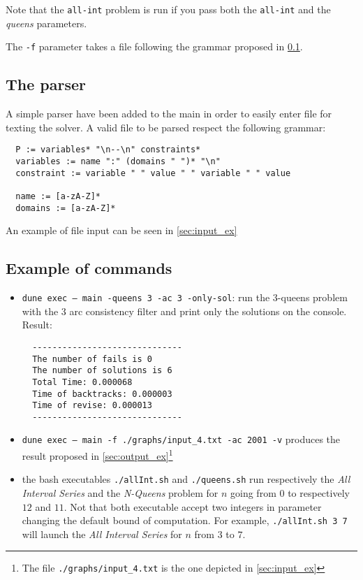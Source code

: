 \documentclass{rapport}
\begin{document}
Note that the \texttt{all-int} problem is run if you pass both the \texttt{all-int} and the \textit{queens} parameters.

The \texttt{-f} parameter takes a file following the grammar proposed in \cref{sec:parser}.

\subsection{The parser}
\label{sec:parser}

A simple parser have been added to the main in order to easily enter file for texting the solver. A valid file to be parsed respect the following grammar:

\begin{verbatim}
  P := variables* "\n--\n" constraints*
  variables := name ":" (domains " ")* "\n"  
  constraint := variable " " value " " variable " " value

  name := [a-zA-Z]*
  domains := [a-zA-Z]*
\end{verbatim}

An example of file input can be seen in \cref{sec:input_ex}


\subsection{Example of commands}

\begin{itemize}
  \item \texttt{dune exec -- main -queens 3 -ac 3 -only-sol}: run the 3-queens problem with the \ac{3} arc consistency filter and print only the solutions on the console. Result:\\
        \begin{verbatim}
  ------------------------------
  The number of fails is 0
  The number of solutions is 6
  Total Time: 0.000068
  Time of backtracks: 0.000003
  Time of revise: 0.000013
  ------------------------------
  \end{verbatim}
  \item \texttt{dune exec -- main -f ./graphs/input\_4.txt -ac 2001 -v} produces the result proposed in \cref{sec:output_ex}\footnote{The file \texttt{./graphs/input\_4.txt} is the one depicted in \cref{sec:input_ex}}
  \item the bash executables \texttt{./allInt.sh} and \texttt{./queens.sh} run respectively the \textit{All Interval Series} and the \textit{N-Queens} problem for $n$ going from $0$ to respectively $12$ and $11$. Not that both executable accept two integers in parameter changing the default bound of computation. For example, \texttt{./allInt.sh 3 7} will launch the \textit{All Interval Series} for $n$ from $3$ to $7$.

\end{itemize}
\end{document}

